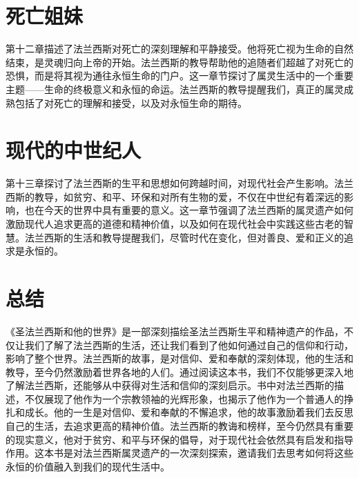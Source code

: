 \documentclass[12pt, a4paper]{ctexart}
\begin{document}
\section{死亡姐妹}
第十二章描述了法兰西斯对死亡的深刻理解和平静接受。他将死亡视为生命的自然结束，是灵魂归向上帝的开始。法兰西斯的教导帮助他的追随者们超越了对死亡的恐惧，而是将其视为通往永恒生命的门户。这一章节探讨了属灵生活中的一个重要主题——生命的终极意义和永恒的命运。法兰西斯的教导提醒我们，真正的属灵成熟包括了对死亡的理解和接受，以及对永恒生命的期待。
\section{现代的中世纪人}
第十三章探讨了法兰西斯的生平和思想如何跨越时间，对现代社会产生影响。法兰西斯的教导，如贫穷、和平、环保和对所有生物的爱，不仅在中世纪有着深远的影响，也在今天的世界中具有重要的意义。这一章节强调了法兰西斯的属灵遗产如何激励现代人追求更高的道德和精神价值，以及如何在现代社会中实践这些古老的智慧。法兰西斯的生活和教导提醒我们，尽管时代在变化，但对善良、爱和正义的追求是永恒的。
\section*{总结}
《圣法兰西斯和他的世界》是一部深刻描绘圣法兰西斯生平和精神遗产的作品，不仅让我们了解了法兰西斯的生活，还让我们看到了他如何通过自己的信仰和行动，影响了整个世界。法兰西斯的故事，是对信仰、爱和奉献的深刻体现，他的生活和教导，至今仍然激励着世界各地的人们。通过阅读这本书，我们不仅能够更深入地了解法兰西斯，还能够从中获得对生活和信仰的深刻启示。书中对法兰西斯的描述，不仅展现了他作为一个宗教领袖的光辉形象，也揭示了他作为一个普通人的挣扎和成长。他的一生是对信仰、爱和奉献的不懈追求，他的故事激励着我们去反思自己的生活，去追求更高的精神价值。法兰西斯的教诲和榜样，至今仍然具有重要的现实意义，他对于贫穷、和平与环保的倡导，对于现代社会依然具有启发和指导作用。这本书是对法兰西斯属灵遗产的一次深刻探索，邀请我们去思考如何将这些永恒的价值融入到我们的现代生活中。
\end{document}
